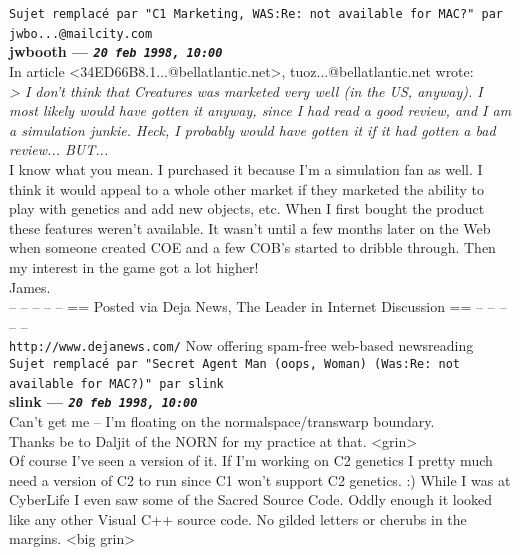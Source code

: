 \documentclass[11pt,twoside,a4paper]{article}
\begin{document}
\begin{multicols*}{2}
 
		
	
		
\texttt{Sujet remplac{\'e} par "C1 Marketing, WAS:Re: not available for MAC?" par jwbo...@mailcity.com}~\\
		
	
		
\textbf{jwbooth --- \emph{\texttt{20 feb 1998, 10:00}}}~\\

In article <34ED66B8.1...@bellatlantic.net>, tuoz...@bellatlantic.net wrote:~\\
\emph{> I don't think that Creatures was marketed very well (in the US, anyway).  I most likely would have gotten it anyway, since I had read a good review, and I am a simulation junkie. Heck, I probably would have gotten it if it had gotten a bad review... BUT...}~\\

I know what you mean. I purchased it because I'm a simulation fan as well. I think it would appeal to a whole other market if they marketed the ability to play with genetics and add new objects, etc. When I first bought the product these features weren't available. It wasn't until a few months later on the Web when someone created COE and a few COB's started to dribble through. Then my interest in the game got a lot higher!~\\

James.~\\

-- -- -- -- -- == Posted via Deja News, The Leader in Internet Discussion == -- -- -- -- --~\\ 
\texttt{http://www.dejanews.com/}   Now offering spam-free web-based newsreading~\\

 
		
	
		
\texttt{Sujet remplac{\'e} par "Secret Agent Man (oops, Woman) (Was:Re: not available for MAC?)" par slink}~\\
		
	
		
\textbf{slink --- \emph{\texttt{20 feb 1998, 10:00}}}~\\

Can't get me -- I'm floating on the normalspace/transwarp boundary.~\\
Thanks be to Daljit of the NORN for my practice at that.  <grin>~\\

Of course I've seen a version of it.  If I'm working on C2 genetics I pretty much need a version of C2 to run since C1 won't support C2 genetics.  :)  While I was at CyberLife I even saw some of the Sacred Source Code.  Oddly enough it looked like any other Visual C++ source code.  No gilded letters or cherubs in the margins.  <big grin>~\\


\end{multicols*}
\end{document}
